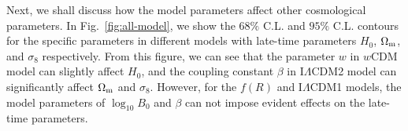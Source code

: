 \documentclass[aps,prd,nofootinbib,amsmath,amssymb,twocolumn,superscriptaddress,10pt]{revtex4}%
\newcommand{\update}[1]{\textcolor{purple}{#1}}
\newcommand{\ILCDM}{I$\Lambda$CDM}
\begin{document}
Next, we shall discuss how the model parameters affect other cosmological parameters. In Fig.~\ref{fig:all-model}, we show the $68\%$ C.L. and $95\%$ C.L. contours for the specific parameters in different models with late-time parameters $H_{0}$, $\Omega_{\rm m}$, and $\sigma_{8}$ respectively. From this figure, we can see that the parameter $w$ in $w$CDM model can slightly affect $H_{0}$, and the coupling constant $\beta$ in I$\Lambda$CDM2 model can significantly affect $\Omega_{\rm m}$ and $\sigma_{8}$.  However, for the $f(R)$ and \ILCDM1 models, the model parameters of $\log_{10}B_{0}$ and $\beta$ can not impose evident effects on the late-time parameters.
\end{document}
